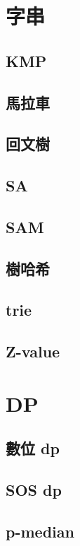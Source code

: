 \documentclass[a4paper,10pt,twocolumn,oneside]{article}
\begin{document}
\section{字串}
\subsection{KMP}

\subsection{馬拉車}

\subsection{回文樹}

\subsection{SA}

\subsection{SAM}

\subsection{樹哈希}

\subsection{trie}

\subsection{Z-value}

\section{DP}
\subsection{數位 dp}

\subsection{SOS dp}

\subsection{p-median}

\end{document}
